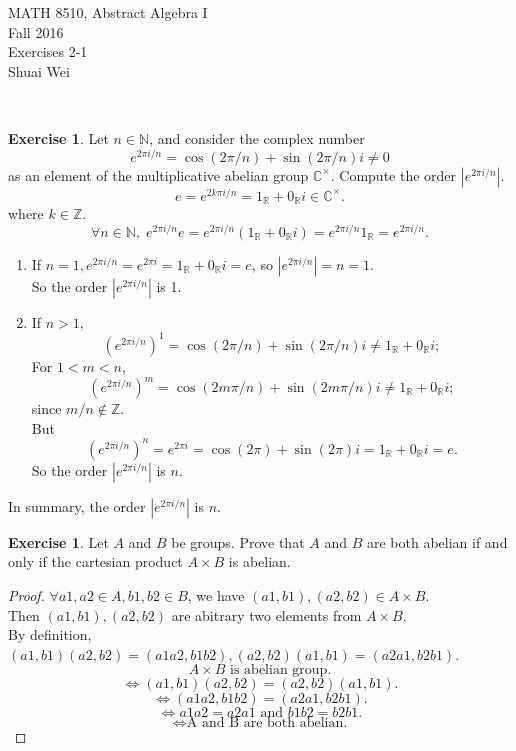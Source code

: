 \documentclass{amsart}
\newcommand{\bbr}{\mathbb{R}}
\newcommand{\bbc}{\mathbb{C}}
\newcommand{\bbz}{\mathbb{Z}}
\newcommand{\bbn}{\mathbb{N}}
\theoremstyle{plain}
\theoremstyle{definition}
\newtheorem{exer}[lem]{Exercise}
\begin{document}
\noindent MATH 8510, Abstract Algebra I \\
Fall 2016\\
Exercises 2-1\\
Shuai Wei

\

%
%

\begin{exer}
Let $n\in\bbn$, and
consider the complex number 
$$e^{2\pi i/n}=\cos(2\pi/n)+\sin(2\pi/n)i\neq 0$$
as an element of the 
multiplicative abelian group $\bbc^\times$.
Compute the order $|e^{2\pi i/n}|$. \\
$$e=e^{2k\pi i/n} = 1_{\bbr} + 0_{\bbr}i \in \bbc^\times.$$
where $k \in {\bbz}$.
$$\forall n \in \bbn, \; e^{2\pi i/n} e = e^{2\pi i/n}(1_{\bbr} + 0_{\bbr}i) = e^{2\pi i/n}1_{\bbr} = e^{2\pi i/n}.$$
\begin{enumerate}
\item
	If $n=1, e^{2\pi i/n} = e^{2\pi i} = 1_{\bbr} + 0_{\bbr}i = e$, so $|e^{2\pi i/n}|= n=1$. \\
	So the order $ |e^{2\pi i/n}|$ is 1.
\item
	If $n > 1$, \\
		$$(e^{2\pi i/n})^1 = \cos(2\pi/n)+\sin(2\pi/n)i \neq 1_{\bbr} + 0_{\bbr}i;$$
		For $1<m<n$,
		$$(e^{2\pi i/n})^m = \cos(2m\pi/n)+\sin(2m\pi/n)i \neq 1_{\bbr} + 0_{\bbr}i;$$
		since $m/n \not\in \bbz$. \\
		But 
		$$(e^{2\pi i/n})^n = e^{2\pi i} =  \cos(2\pi)+\sin(2\pi)i = 1_{\bbr} + 0_{\bbr}i = e.$$
		So the order $ |e^{2\pi i/n}|$ is $n$.
\end{enumerate}
In summary, the order $ |e^{2\pi i/n}|$ is $n$. 

\end{exer}

\begin{exer}
Let $A$ and $B$ be groups. Prove that $A$ and $B$ are both abelian if and only if the cartesian product
$A\times B$ is abelian.
\begin{proof}
	$\forall a1,a2 \in A, b1,b2 \in B$, we have $(a1,b1), (a2,b2) \in A \times B$.\\ Then $(a1,b1), (a2,b2)$ are abitrary two elements from $A \times B.$ \\
	By definition, $(a1,b1)(a2,b2) = (a1a2,b1b2), (a2,b2)(a1,b1)=(a2a1,b2b1)$.
	$$A\times B \text{ is abelian group.}$$ 
	$$\Leftrightarrow (a1,b1)(a2,b2) = (a2,b2)(a1,b1).$$
	$$\Leftrightarrow (a1a2,b1b2) = (a2a1,b2b1).$$
	$$\Leftrightarrow a1a2 = a2a1 \text{ and } b1b2 = b2b1.$$
	$$\Leftrightarrow\text{A and B are both abelian.}$$	
\end{proof}
\end{exer}
\end{document}
